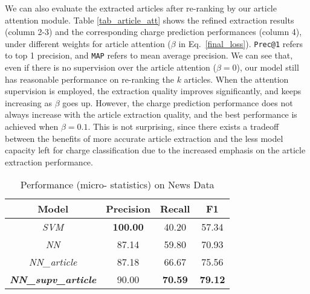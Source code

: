 We can also evaluate the extracted articles after re-ranking by our article attention module.
Table \ref{tab_article_att} shows the refined extraction results  (column 2-3) and the corresponding charge prediction performances (column 4), under different weights for article attention ($\beta$ in Eq.~\ref{final_loss}). \texttt{Prec@1} refers to top 1 precision, and \texttt{MAP} refers to mean average precision.
%
We can see that, even if there is no supervision over the article attention ($\beta=0$), our model still has reasonable performance on re-ranking the $k$ articles. When the attention supervision is employed, the extraction quality improves significantly, and keeps increasing as $\beta$ goes up.
However, the charge prediction performance does not always increase with the article extraction quality, and the best performance is achieved when $\beta=0.1$. This is not surprising, since  there exists a tradeoff between the benefits of more accurate article extraction and the less model capacity left for charge classification due to the increased emphasis on the article extraction performance.

\begin{table}
\centering
\small{
\begin{tabular}{|c|c|c|c|}
\hline
\textbf{Model}												& \textbf{Precision} 				& \textbf{Recall} 				& \textbf{F1} 	\\
\hline
\textit{SVM} 													& \textbf{100.00}						& 40.20  									& 57.34 				 	\\
\hline
\textit{NN}														& 87.14											& 59.80 									& 70.93					\\
\hline
\textit{NN\_article}					& 87.18											& 66.67 									& 75.56					\\
\hline
\textbf{\textit{NN\_supv\_article}} 	& 90.00 										& \textbf{70.59} 					& \textbf{79.12} 		 	\\
\hline
\end{tabular}
}
\caption{Performance (micro- statistics) on News Data}
\label{tabble_news_results}
\end{table}

